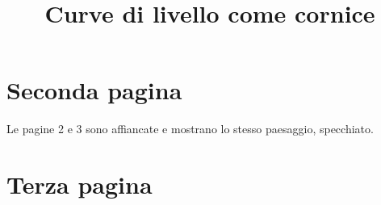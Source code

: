 \documentclass[a4paper,11pt,twoside]{article}
\title{Curve di livello come cornice}
\author{}
\date{}
\begin{document}
\maketitle
\lipsum[1-6]
\newpage
\section{Seconda pagina}
Le pagine 2 e 3 sono affiancate e mostrano lo stesso paesaggio, specchiato.
\lipsum[7-12]
\newpage
\section{Terza pagina}
\lipsum[13-18]
\end{document}

